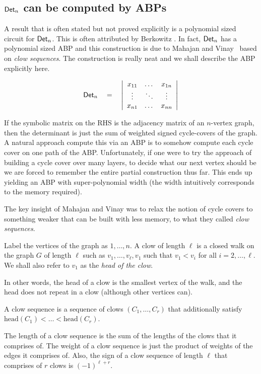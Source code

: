 \subsection{$\mathsf{Det}_n$ can be computed by ABPs}

A result that is often stated but not proved explicitly is a polynomial sized circuit for $\mathsf{Det}_n$. This is often attributed by Berkowitz \cite{Berk84}. In fact, $\mathsf{Det}_n$ has a polynomial sized ABP and this construction is due to Mahajan and Vinay~\cite{mv97} based on \emph{clow sequences}. The construction is really neat and we shall describe the ABP explicitly here. 

\[
\mathsf{Det}_n \quad = \quad \left|\begin{array}{ccc}
x_{11} & \dots & x_{1n}\\
\vdots & \ddots & \vdots \\
x_{n1} & \dots & x_{nn}
\end{array}
\right|\]

If the symbolic matrix on the RHS is the adjacency matrix of an $n$-vertex graph, then the determinant is just the sum of weighted signed cycle-covers of the graph. A natural approach compute this via an ABP is to somehow compute each cycle cover on one path of the ABP. Unfortunately, if one were to try the \naive approach of building a cycle cover over many layers, to decide what our next vertex should be we are forced to remember the entire partial construction thus far. This ends up yielding an ABP with super-polynomial width (the width intuitively corresponds to the memory required). 

The key insight of Mahajan and Vinay was to relax the notion of cycle covers to something weaker that can be built with less memory, to what they called \emph{clow sequences}. 

\begin{definition}
Label the vertices of the graph as $1,\dots, n$. A clow  of length $\ell$ is a closed walk on the graph $G$ of length $\ell$ such as $v_1,\dots, v_\ell,v_1$ such that $v_1 < v_i$ for all $i=2,\dots, \ell$. We shall also refer to $v_1$ as the \emph{head of the clow}. 

In other words, the head of a clow is the smallest vertex of the walk, and the head does not repeat in a clow (although other vertices can). 

A clow sequence is a sequence of clows $(C_1,\dots, C_r)$ that additionally satisfy $\mathrm{head}(C_1) < \dots < \mathrm{head}(C_r)$. 

The length of a clow sequence is the sum of the lengths of the clows that it comprises of. The weight of a clow sequence is just the product of weights of the edges it comprises of. Also, the sign of a clow sequence of length $\ell$ that comprises of $r$ clows is $(-1)^{\ell + r}$. 
\end{definition}

